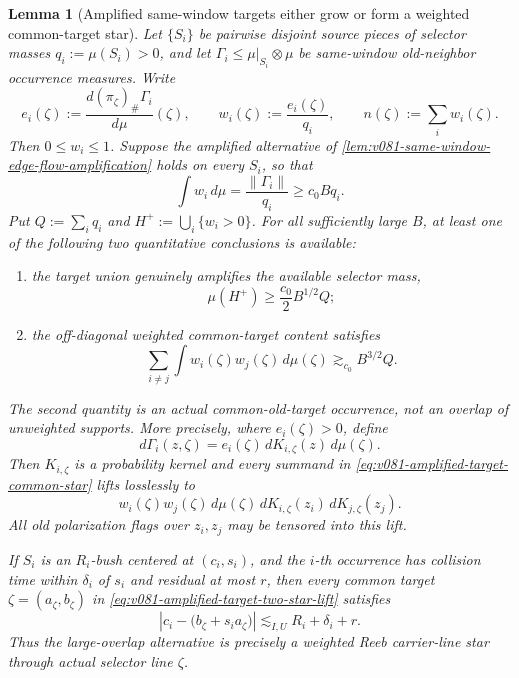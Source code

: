 \documentclass[10pt]{article}
\newtheorem{lemma}[theorem]{Lemma}
\begin{document}
\begin{lemma}[Amplified same-window targets either grow or form a weighted common-target star]
\label{lem:v081-amplified-target-overlap-star}
Let \(\{S_i\}\) be pairwise disjoint source pieces of selector masses
\(q_i:=\mu(S_i)>0\), and let
\(\Gamma_i\le\mu|_{S_i}\otimes\mu\) be same-window old-neighbor occurrence measures.  Write
\[
e_i(\zeta)
:=
\frac{d(\pi_\zeta)_\#\Gamma_i}{d\mu}(\zeta),
\qquad
w_i(\zeta):=\frac{e_i(\zeta)}{q_i},
\qquad
n(\zeta):=\sum_iw_i(\zeta).
\]
Then \(0\le w_i\le1\).  Suppose the amplified alternative of
\cref{lem:v081-same-window-edge-flow-amplification} holds on every \(S_i\), so that
\begin{equation}
\label{eq:v081-amplified-target-weight}
\int w_i\,d\mu
=
\frac{\|\Gamma_i\|}{q_i}
\ge c_0Bq_i.
\end{equation}
Put \(Q:=\sum_iq_i\) and \(H^+:=\bigcup_i\{w_i>0\}\).  For all sufficiently large \(B\), at least
one of the following two quantitative conclusions is available:
\begin{enumerate}[label=\textnormal{(\roman*)}]
\item the target union genuinely amplifies the available selector mass,
\begin{equation}
\label{eq:v081-amplified-target-union-growth}
\mu(H^+)\ge\frac{c_0}{2}B^{1/2}Q;
\end{equation}
\item the off-diagonal weighted common-target content satisfies
\begin{equation}
\label{eq:v081-amplified-target-common-star}
\boxed{
\sum_{i\ne j}\int w_i(\zeta)w_j(\zeta)\,d\mu(\zeta)
\gtrsim_{c_0}
B^{3/2}Q.
}
\end{equation}
\end{enumerate}
The second quantity is an actual common-old-target occurrence, not an overlap of unweighted
supports.  More precisely, where \(e_i(\zeta)>0\), define
\[
d\Gamma_i(z,\zeta)
=
e_i(\zeta)\,dK_{i,\zeta}(z)\,d\mu(\zeta).
\]
Then \(K_{i,\zeta}\) is a probability kernel and every summand in
\eqref{eq:v081-amplified-target-common-star} lifts losslessly to
\begin{equation}
\label{eq:v081-amplified-target-two-star-lift}
w_i(\zeta)w_j(\zeta)\,d\mu(\zeta)\,
dK_{i,\zeta}(z_i)\,dK_{j,\zeta}(z_j).
\end{equation}
All old polarization flags over \(z_i,z_j\) may be tensored into this lift.

If \(S_i\) is an \(R_i\)-bush centered at \((c_i,s_i)\), and the \(i\)-th occurrence has collision
time within \(\delta_i\) of \(s_i\) and residual at most \(r\), then every common target
\(\zeta=(a_\zeta,b_\zeta)\) in \eqref{eq:v081-amplified-target-two-star-lift} satisfies
\begin{equation}
\label{eq:v081-amplified-target-carrier-line}
\left|
c_i-\bigl(b_\zeta+s_i a_\zeta\bigr)
\right|
\lesssim_{I,U}
R_i+\delta_i+r.
\end{equation}
Thus the large-overlap alternative is precisely a weighted Reeb carrier-line star through actual
selector line \(\zeta\).
\end{lemma}
\end{document}
